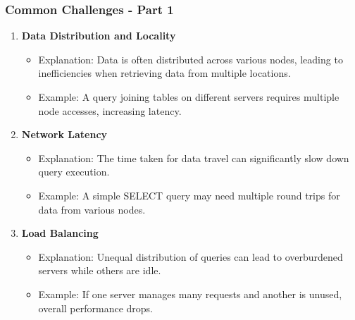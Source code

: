 \documentclass[aspectratio=169]{beamer}
\begin{document}
\begin{frame}[fragile]
    \frametitle{Common Challenges - Part 1}
    
    \begin{enumerate}
        \item \textbf{Data Distribution and Locality}
            \begin{itemize}
                \item Explanation: Data is often distributed across various nodes, leading to inefficiencies when retrieving data from multiple locations.
                \item Example: A query joining tables on different servers requires multiple node accesses, increasing latency.
            \end{itemize}

        \item \textbf{Network Latency}
            \begin{itemize}
                \item Explanation: The time taken for data travel can significantly slow down query execution.
                \item Example: A simple SELECT query may need multiple round trips for data from various nodes.
            \end{itemize}

        \item \textbf{Load Balancing}
            \begin{itemize}
                \item Explanation: Unequal distribution of queries can lead to overburdened servers while others are idle.
                \item Example: If one server manages many requests and another is unused, overall performance drops.
            \end{itemize}
    \end{enumerate}
\end{frame}
\end{document}
